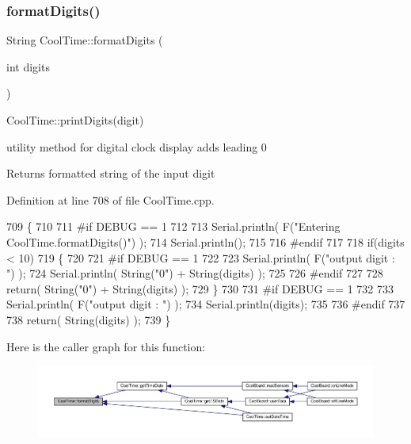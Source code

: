 \subsubsection{\texorpdfstring{format\+Digits()}{formatDigits()}}
{\footnotesize\ttfamily String Cool\+Time\+::format\+Digits (\begin{DoxyParamCaption}\item[{int}]{digits }\end{DoxyParamCaption})}

Cool\+Time\+::print\+Digits(digit)

utility method for digital clock display adds leading 0

\begin{DoxyReturn}{Returns}
formatted string of the input digit 
\end{DoxyReturn}


Definition at line 708 of file Cool\+Time.\+cpp.


\begin{DoxyCode}
709 \{
710 
711 \textcolor{preprocessor}{#if DEBUG == 1 }
712 
713     Serial.println( F(\textcolor{stringliteral}{"Entering CoolTime.formatDigits()"}) );
714     Serial.println();
715 
716 \textcolor{preprocessor}{#endif }
717 
718     \textcolor{keywordflow}{if}(digits < 10)
719     \{
720     
721 \textcolor{preprocessor}{    #if DEBUG == 1}
722 
723         Serial.println( F(\textcolor{stringliteral}{"output digit : "}) );
724         Serial.println( String(\textcolor{stringliteral}{"0"}) + String(digits) );
725 
726 \textcolor{preprocessor}{    #endif}
727 
728         \textcolor{keywordflow}{return}( String(\textcolor{stringliteral}{"0"}) + String(digits) );
729     \}
730     
731 \textcolor{preprocessor}{#if DEBUG == 1 }
732 
733     Serial.println( F(\textcolor{stringliteral}{"output digit : "}) );
734     Serial.println(digits);
735 
736 \textcolor{preprocessor}{#endif}
737 
738     \textcolor{keywordflow}{return}( String(digits) );
739 \}
\end{DoxyCode}
Here is the caller graph for this function\+:\nopagebreak
\begin{figure}[H]
\begin{center}
\leavevmode
\includegraphics[width=350pt]{d6/d49/class_cool_time_acd537cd4210d7bde4e1f5c47d2ac0456_icgraph}
\end{center}
\end{figure}
\mbox{\label{class_cool_time_ac4f32ee513c1328d984306645e8785a4}} 
